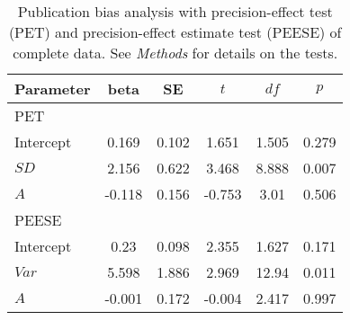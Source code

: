 \begin{table}[ht]
\centering
\caption{Publication bias analysis with precision-effect test (PET) and precision-effect estimate test (PEESE) of complete data. See \textit{Methods} for details on the tests.} 
\label{tab:PET-PEESE}
\begin{tabular}{lccccc}
  \hline
Parameter & beta & SE & $t$ & $df$ & $p$ \\ 
  \hline
PET &  &  &  &  &  \\ 
  Intercept & 0.169 & 0.102 & 1.651 & 1.505 & 0.279 \\ 
  $SD$ & 2.156 & 0.622 & 3.468 & 8.888 & 0.007 \\ 
  $A$ & -0.118 & 0.156 & -0.753 & 3.01 & 0.506 \\ 
  PEESE &  &  &  &  &  \\ 
  Intercept & 0.23 & 0.098 & 2.355 & 1.627 & 0.171 \\ 
  $Var$ & 5.598 & 1.886 & 2.969 & 12.94 & 0.011 \\ 
  $A$ & -0.001 & 0.172 & -0.004 & 2.417 & 0.997 \\ 
   \hline
\end{tabular}
\end{table}
